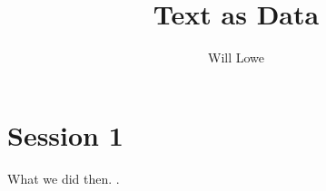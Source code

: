 \documentclass[nofonts,nobib,a4paper,justified]{tufte-book}
\title{Text as Data}
\author{Will Lowe}
\begin{document}
\frontmatter
\maketitle
\tableofcontents
  
\chapter{Session 1}  
  
What we did then. \cite{Lowe.Benoit2013}. 
  
  
\printbibliography
  
\end{document}

